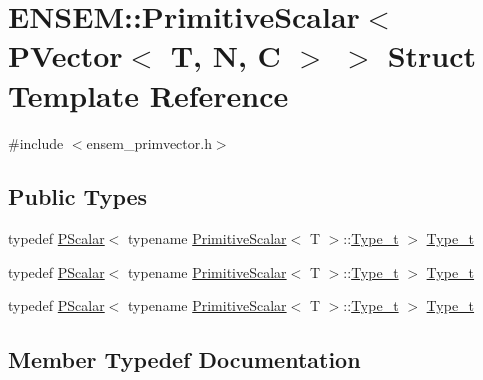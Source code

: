 \hypertarget{structENSEM_1_1PrimitiveScalar_3_01PVector_3_01T_00_01N_00_01C_01_4_01_4}{}\section{E\+N\+S\+EM\+:\+:Primitive\+Scalar$<$ P\+Vector$<$ T, N, C $>$ $>$ Struct Template Reference}
\label{structENSEM_1_1PrimitiveScalar_3_01PVector_3_01T_00_01N_00_01C_01_4_01_4}


{\ttfamily \#include $<$ensem\+\_\+primvector.\+h$>$}

\subsection*{Public Types}
\begin{DoxyCompactItemize}
\item 
typedef \mbox{\hyperlink{classENSEM_1_1PScalar}{P\+Scalar}}$<$ typename \mbox{\hyperlink{structENSEM_1_1PrimitiveScalar}{Primitive\+Scalar}}$<$ T $>$\+::\mbox{\hyperlink{structENSEM_1_1PrimitiveScalar_3_01PVector_3_01T_00_01N_00_01C_01_4_01_4_afc0dde305bcae3b52f619989d06ed843}{Type\+\_\+t}} $>$ \mbox{\hyperlink{structENSEM_1_1PrimitiveScalar_3_01PVector_3_01T_00_01N_00_01C_01_4_01_4_afc0dde305bcae3b52f619989d06ed843}{Type\+\_\+t}}
\item 
typedef \mbox{\hyperlink{classENSEM_1_1PScalar}{P\+Scalar}}$<$ typename \mbox{\hyperlink{structENSEM_1_1PrimitiveScalar}{Primitive\+Scalar}}$<$ T $>$\+::\mbox{\hyperlink{structENSEM_1_1PrimitiveScalar_3_01PVector_3_01T_00_01N_00_01C_01_4_01_4_afc0dde305bcae3b52f619989d06ed843}{Type\+\_\+t}} $>$ \mbox{\hyperlink{structENSEM_1_1PrimitiveScalar_3_01PVector_3_01T_00_01N_00_01C_01_4_01_4_afc0dde305bcae3b52f619989d06ed843}{Type\+\_\+t}}
\item 
typedef \mbox{\hyperlink{classENSEM_1_1PScalar}{P\+Scalar}}$<$ typename \mbox{\hyperlink{structENSEM_1_1PrimitiveScalar}{Primitive\+Scalar}}$<$ T $>$\+::\mbox{\hyperlink{structENSEM_1_1PrimitiveScalar_3_01PVector_3_01T_00_01N_00_01C_01_4_01_4_afc0dde305bcae3b52f619989d06ed843}{Type\+\_\+t}} $>$ \mbox{\hyperlink{structENSEM_1_1PrimitiveScalar_3_01PVector_3_01T_00_01N_00_01C_01_4_01_4_afc0dde305bcae3b52f619989d06ed843}{Type\+\_\+t}}
\end{DoxyCompactItemize}


\subsection{Member Typedef Documentation}
\mbox{\label{structENSEM_1_1PrimitiveScalar_3_01PVector_3_01T_00_01N_00_01C_01_4_01_4_afc0dde305bcae3b52f619989d06ed843}} 

